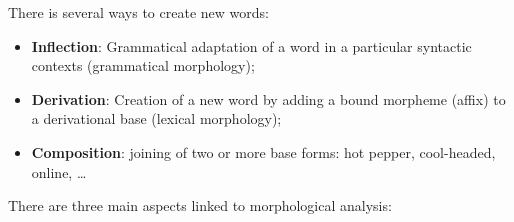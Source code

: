 There is several ways to create new words:

\begin{itemize}
	\item \textbf{Inflection}: Grammatical adaptation of a word in a particular syntactic contexts (grammatical morphology);
	\item \textbf{Derivation}: Creation of a new word by adding a bound morpheme (affix) to a derivational base (lexical morphology);
	\item \textbf{Composition}: joining of two or more base forms: hot pepper, cool-headed, online, \dots
\end{itemize}

\vspace{10px}


There are three main aspects linked to morphological analysis:


